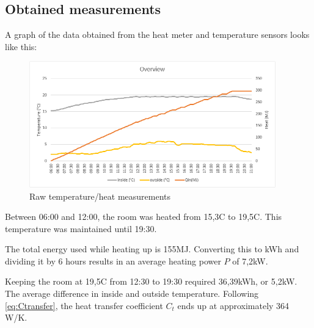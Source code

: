 \documentclass[12pt,a4paper,final]{report}
\begin{document}
\subsection{Obtained measurements}
A graph of the data obtained from the heat meter and temperature sensors looks like this:
\begin{figure}[H]
  \begin{center}
      \includegraphics[width=0.95\textwidth]{GraphMeasurements}
  \end{center}
  \caption{Raw temperature/heat measurements}
\end{figure}
Between 06:00 and 12:00, the room was heated from 15,3\degree{}C to 19,5\degree{}C. This temperature was maintained until 19:30.

The total energy used while heating up is 155MJ. Converting this to kWh and dividing it by 6 hours results in an average heating power $P$ of 7,2kW.

Keeping the room at 19,5\degree{}C from 12:30 to 19:30 required 36,39kWh, or 5,2kW. The average difference in inside and outside temperature. Following \eqref{eq:Ctransfer}, the heat transfer coefficient $C_{t}$ ends up at approximately 364 W/K.
\end{document}
